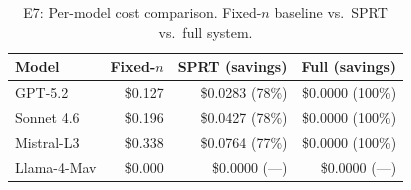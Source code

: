 \begin{table}[t]
\centering
\caption{E7: Per-model cost comparison. Fixed-$n$ baseline vs.\ SPRT vs.\ full system.}
\label{tab:e7-per-model}
\small
\begin{tabular}{lrrr}
\toprule
\textbf{Model} & \textbf{Fixed-$n$} & \textbf{SPRT (savings)} & \textbf{Full (savings)} \\
\midrule
    GPT-5.2 & \$0.127 & \$0.0283 (78\%) & \$0.0000 (100\%) \\
    Sonnet 4.6 & \$0.196 & \$0.0427 (78\%) & \$0.0000 (100\%) \\
    Mistral-L3 & \$0.338 & \$0.0764 (77\%) & \$0.0000 (100\%) \\
    Llama-4-Mav & \$0.000 & \$0.0000 (---) & \$0.0000 (---) \\
\bottomrule
\end{tabular}
\end{table}